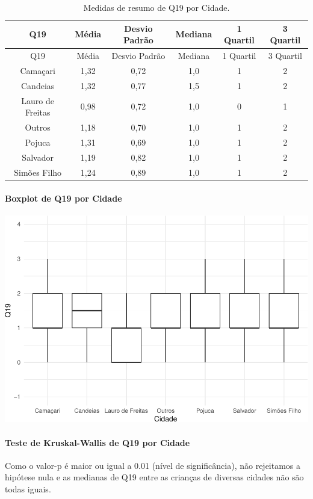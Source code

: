 \documentclass[]{article}
\let\oldparagraph\paragraph
\renewcommand{\paragraph}[1]{\oldparagraph{#1}\mbox{}}
\begin{document}
\begin{longtable}[]{@{}cccccc@{}}
\caption{\label{tab:unnamed-chunk-311}Medidas de resumo de Q19 por Cidade.}\tabularnewline
\toprule
Q19 & Média & Desvio Padrão & Mediana & 1 Quartil & 3 Quartil\tabularnewline
\midrule
\endfirsthead
\toprule
Q19 & Média & Desvio Padrão & Mediana & 1 Quartil & 3 Quartil\tabularnewline
\midrule
\endhead
Camaçari & 1,32 & 0,72 & 1,0 & 1 & 2\tabularnewline
Candeias & 1,32 & 0,77 & 1,5 & 1 & 2\tabularnewline
Lauro de Freitas & 0,98 & 0,72 & 1,0 & 0 & 1\tabularnewline
Outros & 1,18 & 0,70 & 1,0 & 1 & 2\tabularnewline
Pojuca & 1,31 & 0,69 & 1,0 & 1 & 2\tabularnewline
Salvador & 1,19 & 0,82 & 1,0 & 1 & 2\tabularnewline
Simões Filho & 1,24 & 0,89 & 1,0 & 1 & 2\tabularnewline
\bottomrule
\end{longtable}

\hypertarget{boxplot-de-q19-por-cidade}{%
\paragraph{Boxplot de Q19 por Cidade}\label{boxplot-de-q19-por-cidade}}

\begin{center}\includegraphics[width=0.75\linewidth]{relatorio_covid19_files/figure-latex/unnamed-chunk-312-1} \end{center}

\hypertarget{teste-de-kruskal-wallis-de-q19-por-cidade}{%
\paragraph{Teste de Kruskal-Wallis de Q19 por Cidade}\label{teste-de-kruskal-wallis-de-q19-por-cidade}}

Como o valor-p é maior ou igual a 0.01 (nível de significância), não rejeitamos a hipótese nula e as medianas de Q19 entre as crianças de diversas cidades não são todas iguais.
\end{document}
